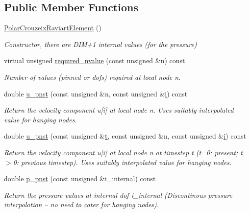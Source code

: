 \subsection*{Public Member Functions}
\begin{DoxyCompactItemize}
\item 
\hyperlink{classoomph_1_1PolarCrouzeixRaviartElement_a1593de18cfe047a3224301c0618fd49d}{Polar\+Crouzeix\+Raviart\+Element} ()
\begin{DoxyCompactList}\small\item\em Constructor, there are D\+I\+M+1 internal values (for the pressure) \end{DoxyCompactList}\item 
virtual unsigned \hyperlink{classoomph_1_1PolarCrouzeixRaviartElement_a36edbd6c9a877d4da2c99d5e70691c34}{required\+\_\+nvalue} (const unsigned \&n) const
\begin{DoxyCompactList}\small\item\em Number of values (pinned or dofs) required at local node n. \end{DoxyCompactList}\item 
double \hyperlink{classoomph_1_1PolarCrouzeixRaviartElement_a9c214952496bbb3e777e7c49d4579377}{u\+\_\+pnst} (const unsigned \&n, const unsigned \&\hyperlink{cfortran_8h_adb50e893b86b3e55e751a42eab3cba82}{i}) const
\begin{DoxyCompactList}\small\item\em Return the velocity component u\mbox{[}i\mbox{]} at local node n. Uses suitably interpolated value for hanging nodes. \end{DoxyCompactList}\item 
double \hyperlink{classoomph_1_1PolarCrouzeixRaviartElement_a0c61f886e4869b04ef14e4f160812985}{u\+\_\+pnst} (const unsigned \&\hyperlink{cfortran_8h_af6f0bd3dc13317f895c91323c25c2b8f}{t}, const unsigned \&n, const unsigned \&\hyperlink{cfortran_8h_adb50e893b86b3e55e751a42eab3cba82}{i}) const
\begin{DoxyCompactList}\small\item\em Return the velocity component u\mbox{[}i\mbox{]} at local node n at timestep t (t=0\+: present; t$>$0\+: previous timestep). Uses suitably interpolated value for hanging nodes. \end{DoxyCompactList}\item 
double \hyperlink{classoomph_1_1PolarCrouzeixRaviartElement_ac11e6ee68acf235bb6d2b41a2bd77d89}{p\+\_\+pnst} (const unsigned \&i\+\_\+internal) const
\begin{DoxyCompactList}\small\item\em Return the pressure values at internal dof i\+\_\+internal (Discontinous pressure interpolation -- no need to cater for hanging nodes). \end{DoxyCompactList}\item 

\end{DoxyCompactItemize}
